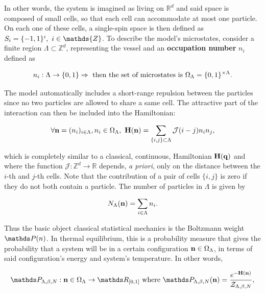 \documentclass{homework}
\begin{document}
In other words, the system is imagined as living on $\mathds{R}^d$ and said space is composed of small cells, so that each cell can accommodate at most one particle. On each one of these cells, a single-spin space is then defined as $S_i = \{-1, 1\}^{i}, \blanky i \in \mathds{Z}$. To describe the model's microstates, consider a finite region $\Lambda \subset \mathds{Z}^d$, representing the vessel and an \textbf{occupation number} $n_i$ defined as 

\begin{equation}
    n_i : \Lambda \rightarrow \{0,1\} \Rightarrow \textnormal{ then the set of microstates is } \Omega_{\Lambda} = \{0, 1\}^{\times \Lambda}.
\end{equation}

The model automatically includes a short-range repulsion between the particles since no two particles are allowed to share a same cell. The attractive part of the interaction can then be included into the Hamiltonian:

$$
    \forall {\bf n} = (n_i)_{i \in \Lambda}, n_i \in \Omega_{\Lambda}, \textnormal{ } {\bf H}({\bf n}) = \sum_{\{i,j\} \subset \Lambda} \mathcal{J}(i-j) n_i n_j, 
$$

which is completely similar to a classical, continuous, Hamiltonian ${\bf H}({\bf q})$ and where the function $\mathcal{J}: \mathds{Z}^d \rightarrow \mathds{R}$ depends, \textit{a priori}, only on the distance between the $i$-th and $j$-th cells. Note that the contribution of a pair of cells $\{i,j\}$ is zero if they do not both contain a particle. The number of particles in $\Lambda$ is given by 

$$
    N_{\Lambda}({\bf n}) = \sum_{i\in\Lambda} n_i.
$$

Thus the basic object classical statistical mechanics is the Boltzmann weight $\prob(n)$. In thermal equilibrium, this is a probability measure that gives the probability that a system will be in a certain configuration ${\bf n} \in \Omega_{\Lambda}$, in terms of said configuration's energy and system's temperature. In other words,

\begin{equation}
    \begin{split}
        \prob_{\Lambda, \beta, N} :{\bf n} \in \Omega_{\Lambda}\rightarrow \R_{[0,1]} \textnormal{ where }
         \prob_{\Lambda, \beta, N} {(\bf n)} = \frac{e^{- {\bf H}({\bf n})}}{\mathcal{Z}_{\Lambda, \beta, N}},
    \end{split}
\end{equation}
\end{document}
